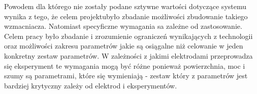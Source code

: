 \begin{frame}[t]
    
\end{frame}




\begin{frame}[t]
    \vspace{-1em}
    \begin{block}{\af}
    \end{block}
    {\renewcommand\normalsize{\small}%
\normalsize
Powodem dla którego nie zostały podane sztywne wartości dotyczące systemu wynika z tego, że celem projektubyło zbadanie możliwości zbudowanie takiego wzmacniacza. Natomiast specyficzne wymagania sa zależne od zastosowanie. Celem pracy było zbadanie i zrozumienie ograniczeń wynikających z technologii oraz możliwości zakresu parametrów jakie są osiągalne  niż celowanie w jeden konkretny zestaw parametrów. W zależności z jakimi  elektrodami  przeprowadza się eksperyment te wymagania mogą być różne ponieważ powierzchnia, moc i szumy są parametrami, które się wymieniają - zestaw który z parametrów jest bardziej krytyczny zależy od elektrod i eksperymentów. 

}
    
\end{frame}




